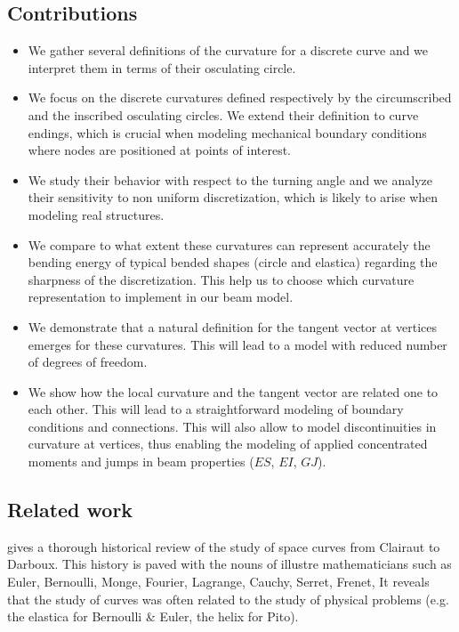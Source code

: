 \subsection{Contributions}
\begin{itemize}
\item We gather several definitions of the curvature for a discrete curve and we interpret them in terms of their osculating circle.
\item We focus on the discrete curvatures defined respectively by the circumscribed and the inscribed osculating circles. We extend their definition to curve endings, which is crucial when modeling mechanical boundary conditions where nodes are positioned at points of interest.
\item  We study their behavior with respect to the turning angle and we analyze their sensitivity to non uniform discretization, which is likely to arise when modeling real structures.
\item We compare to what extent these curvatures can represent accurately the bending energy of typical bended shapes (circle and elastica) regarding the sharpness of the discretization. This help us to choose which curvature representation to implement in our beam model.
\item We demonstrate that a natural definition for the tangent vector at vertices emerges for these curvatures. This will lead to a model with reduced number of degrees of freedom.
\item We show how the local curvature and the tangent vector are related one to each other. This will lead to a straightforward modeling of boundary conditions and connections. This will also allow to model discontinuities in curvature at vertices, thus enabling the modeling of applied concentrated moments and jumps in beam properties ($ES$, $EI$, $GJ$).
\end{itemize}


\subsection{Related work}

 gives a thorough historical review of the study of space curves from Clairaut to Darboux. This history is paved with the nouns of illustre mathematicians such as Euler, Bernoulli, Monge, Fourier, Lagrange, Cauchy, Serret, Frenet, \telp{} It reveals that the study of curves was often related to the study of physical problems (e.g. the elastica for Bernoulli \& Euler, the helix for Pito).

